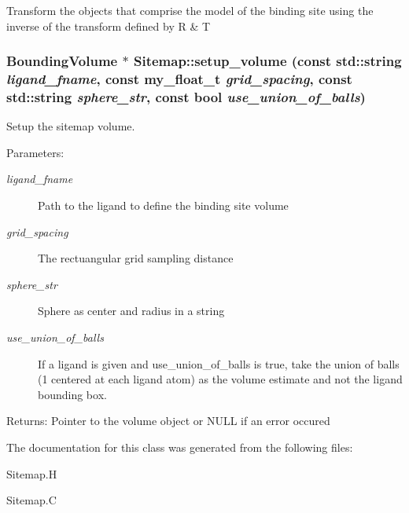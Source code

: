 Transform the objects that comprise the model of the binding site using the inverse of the transform defined by R \& T 
\subsubsection{\setlength{\rightskip}{0pt plus 5cm}\bf{Bounding\-Volume} $\ast$ Sitemap::setup\_\-volume (const std::string {\em ligand\_\-fname}, const my\_\-float\_\-t {\em grid\_\-spacing}, const std::string {\em sphere\_\-str}, const bool {\em use\_\-union\_\-of\_\-balls})\hspace{0.3cm}{\tt  [private]}}\label{classSimSite3D_1_1Sitemap_dbc5be7e837523050ebf38da9fca1d1f}


Setup the sitemap volume. 

\begin{Desc}
\item[Parameters:]
\begin{description}
\item[{\em ligand\_\-fname}]Path to the ligand to define the binding site volume \item[{\em grid\_\-spacing}]The rectuangular grid sampling distance \item[{\em sphere\_\-str}]Sphere as center and radius in a string \item[{\em use\_\-union\_\-of\_\-balls}]If a ligand is given and use\_\-union\_\-of\_\-balls is true, take the union of balls (1 centered at each ligand atom) as the volume estimate and not the ligand bounding box. \end{description}
\end{Desc}
\begin{Desc}
\item[Returns:]Pointer to the volume object or NULL if an error occured \end{Desc}


The documentation for this class was generated from the following files:\begin{CompactItemize}
\item 
Sitemap.H\item 
Sitemap.C\end{CompactItemize}

